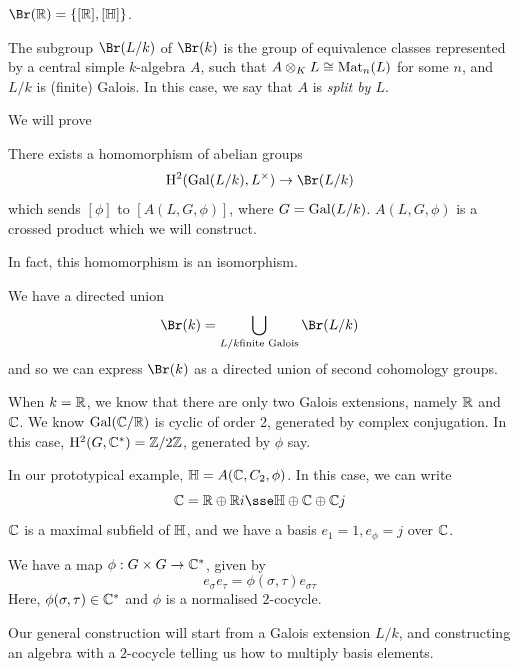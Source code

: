 \documentclass{article}
\begin{document}
\begin{example}
    \(\Br(\R) = \{[\R], [\bb H]\}\).
\end{example}

\begin{definition}
    The subgroup \(\Br(L/k)\) of \(\Br(k)\) is the group of equivalence classes represented by a central simple \(k\)-algebra \(A\), such that \(A \otimes_K L \cong \operatorname{Mat}_n(L)\) for some \(n\), and \(L/k\) is (finite) Galois. In this case, we say that \(A\) is \emph{split by \(L\)}. 
\end{definition}

We will prove

\begin{theorem}
    There exists a homomorphism of abelian groups
    \[\HH^2(\Gal(L/k), L^\times) \to \Br(L/k)\]
    which sends \([\phi]\) to \([A(L, G, \phi)]\), where \(G = \operatorname{Gal}(L/k)\). \(A(L, G, \phi)\) is a crossed product which we will construct.
\end{theorem}

\begin{remark}
    In fact, this homomorphism is an isomorphism.
\end{remark}

\begin{remark}
    We have a directed union
    \[\Br(k) = \bigcup_{L/k \text{finite Galois}}\Br(L/k)\]
    and so we can express \(\Br(k)\) as a directed union of second cohomology groups.
\end{remark}

\begin{example}
    When \(k = \mathbb{R}\), we know that there are only two Galois extensions, namely \(\mathbb{R}\) and \(\mathbb{C}\). We know \(\operatorname{Gal}(\mathbb{C}/\mathbb{R})\) is cyclic of order 2, generated by complex conjugation. In this case, \(\mathrm{H}^2(G, \mathbb{C}^*) = \mathbb{Z}/2\mathbb{Z}\), generated by \(\phi\) say.

    In our prototypical example, \(\mathbb{H} = A(\mathbb{C}, C_2, \phi)\). In this case, we can write
    \[\C = \R \oplus \R i \sse \bb H \oplus \C \oplus \C j\]
    \(\mathbb{C}\) is a maximal subfield of \(\mathbb{H}\), and we have a basis \(e_1 = 1, e_\phi = j\) over \(\mathbb{C}\).

    We have a map \(\phi : G \times G \to \mathbb{C}^*\), given by
    \[e_\sigma e_\tau = \phi(\sigma, \tau)e_{\sigma\tau}\]
    Here, \(\phi(\sigma, \tau) \in \mathbb{C}^*\) and \(\phi\) is a normalised \(2\)-cocycle.
\end{example}

Our general construction will start from a Galois extension \(L/k\), and constructing an algebra with a \(2\)-cocycle telling us how to multiply basis elements.
\end{document}
